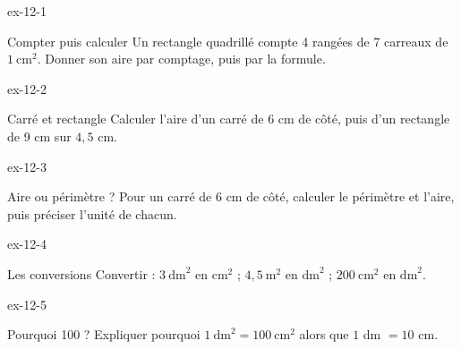\clearpage{}
\begin{blocLivre}{ex-12-1}\begin{exercice}[1]{Compter puis calculer}
Un rectangle quadrillé compte 4 rangées de 7 carreaux de $1\ \mathrm{cm}^2$. Donner son aire par comptage, puis par la formule.
\label{fig-ex-12-1}
\end{exercice}\end{blocLivre}
\begin{blocLivre}{ex-12-2}\begin{exercice}[1]{Carré et rectangle}
Calculer l’aire d’un carré de 6 cm de côté, puis d’un rectangle de 9 cm sur $4{,}5$ cm.
\end{exercice}\end{blocLivre}
\begin{blocLivre}{ex-12-3}\begin{exercice}[1]{Aire ou périmètre ?}
Pour un carré de 6 cm de côté, calculer le périmètre et l’aire, puis préciser l’unité de chacun.
\end{exercice}\end{blocLivre}
\begin{blocLivre}{ex-12-4}\begin{exercice}[1]{Les conversions}
Convertir : $3\ \mathrm{dm}^2$ en $\mathrm{cm}^2$ ; $4{,}5\ \mathrm m^2$ en $\mathrm{dm}^2$ ; $200\ \mathrm{cm}^2$ en $\mathrm{dm}^2$.
\end{exercice}\end{blocLivre}
\begin{blocLivre}{ex-12-5}\begin{exercice}[1]{Pourquoi 100 ?}
Expliquer pourquoi $1\ \mathrm{dm}^2=100\ \mathrm{cm}^2$ alors que $1$ dm $=10$ cm.
\label{fig-ex-12-5}
\end{exercice}\end{blocLivre}

